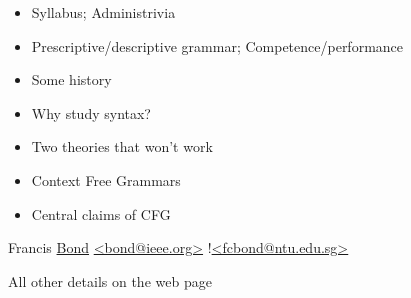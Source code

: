 \documentclass[a4paper,landscape,headrule,footrule]{foils}
\begin{document}
\maketitle

%


\begin{itemize}
\item Syllabus; Administrivia
\item Prescriptive/descriptive grammar;
Competence/performance
\item Some history
\item Why study syntax?
\item Two theories that won’t work
\item Context Free Grammars
\item Central claims of CFG
\end{itemize}

\begin{description}
\item [Coordinator]  Francis \ul{Bond} 
{\small \url{<bond@ieee.org>} !\url{<fcbond@ntu.edu.sg>}}
\item All other details on the web page

\end{description}

\end{document}
